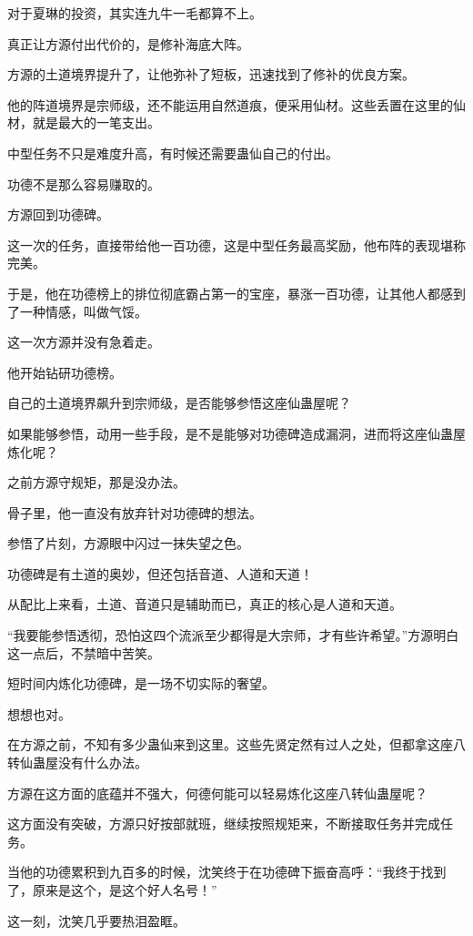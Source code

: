 \begin{this_body}
对于夏琳的投资，其实连九牛一毛都算不上。

真正让方源付出代价的，是修补海底大阵。

方源的土道境界提升了，让他弥补了短板，迅速找到了修补的优良方案。

他的阵道境界是宗师级，还不能运用自然道痕，便采用仙材。这些丢置在这里的仙材，就是最大的一笔支出。

中型任务不只是难度升高，有时候还需要蛊仙自己的付出。

功德不是那么容易赚取的。

方源回到功德碑。

这一次的任务，直接带给他一百功德，这是中型任务最高奖励，他布阵的表现堪称完美。

于是，他在功德榜上的排位彻底霸占第一的宝座，暴涨一百功德，让其他人都感到了一种情感，叫做气馁。

这一次方源并没有急着走。

他开始钻研功德榜。

自己的土道境界飙升到宗师级，是否能够参悟这座仙蛊屋呢？

如果能够参悟，动用一些手段，是不是能够对功德碑造成漏洞，进而将这座仙蛊屋炼化呢？

之前方源守规矩，那是没办法。

骨子里，他一直没有放弃针对功德碑的想法。

参悟了片刻，方源眼中闪过一抹失望之色。

功德碑是有土道的奥妙，但还包括音道、人道和天道！

从配比上来看，土道、音道只是辅助而已，真正的核心是人道和天道。

“我要能参悟透彻，恐怕这四个流派至少都得是大宗师，才有些许希望。”方源明白这一点后，不禁暗中苦笑。

短时间内炼化功德碑，是一场不切实际的奢望。

想想也对。

在方源之前，不知有多少蛊仙来到这里。这些先贤定然有过人之处，但都拿这座八转仙蛊屋没有什么办法。

方源在这方面的底蕴并不强大，何德何能可以轻易炼化这座八转仙蛊屋呢？

这方面没有突破，方源只好按部就班，继续按照规矩来，不断接取任务并完成任务。

当他的功德累积到九百多的时候，沈笑终于在功德碑下振奋高呼：“我终于找到了，原来是这个，是这个好人名号！”

这一刻，沈笑几乎要热泪盈眶。


\end{this_body}
